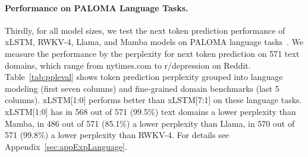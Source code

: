 \documentclass[dvipsnames]{article}
\begin{document}
\begin{table}[htbp]
    \centering
    \begin{adjustbox}{width=\textwidth}
        
    \end{adjustbox}
    \vspace{0.1cm}
    \caption{Performance on PALOMA Language Modeling Tasks. 
    Comparison of xLSTM, RWKV-4, Llama, and Mamba by the perplexity
    of next token prediction on the PALOMA language benchmark 
    after training on 300B tokens from SlimPajama. 
    Model sizes are 125M, 250M, 760M, and 1.3B.
    The second column shows the actual number of parameters.
    The 571 text domains are grouped into language modeling (next seven columns) 
    and fine-grained domain benchmarks (further 5 columns). 
    The last column shows the average perplexity across all of these tasks.
    Best model per model size is given in bold and the second best 
    is underlined.
    xLSTM yields the best performance.
    \label{tab:ppleval}
}  
\end{table}

\vspace{-0.2cm}
\paragraph{Performance on PALOMA Language Tasks.}
Thirdly, for all model sizes,
we test the next token prediction 
performance of xLSTM, RWKV-4, Llama, and Mamba models 
on PALOMA language tasks~\citep{Magnusson:23arxivshort}.
We measure the performance by the perplexity for next token prediction
on 571 text domains, which range from 
nytimes.com to r/depression on Reddit.
Table~\ref{tab:ppleval} shows token prediction perplexity
grouped into language modeling (first seven columns) and 
fine-grained domain benchmarks (last 5 columns). 
xLSTM[1:0] performs better than xLSTM[7:1] on these language tasks.
xLSTM[1:0] has 
in 568 out of 571 (99.5\%) text domains a lower perplexity than Mamba, 
in 486 out of 571 (85.1\%) a lower perplexity than Llama,
in 570 out of 571 (99.8\%) a lower perplexity than RWKV-4.
For details see Appendix~\ref{sec:appExpLanguage}. 
\end{document}
